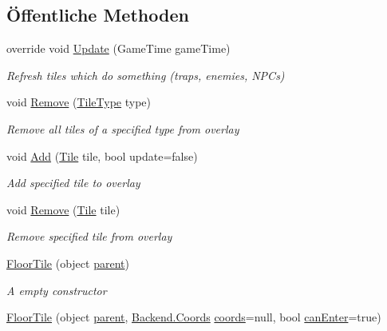 \subsection*{Öffentliche Methoden}
\begin{DoxyCompactItemize}
\item 
override void \hyperlink{class_gruppe22_1_1_backend_1_1_floor_tile_ae3d0627204d49dabc8180fd0bdd22803}{Update} (Game\-Time game\-Time)
\begin{DoxyCompactList}\small\item\em Refresh tiles which do something (traps, enemies, N\-P\-Cs) \end{DoxyCompactList}\item 
void \hyperlink{class_gruppe22_1_1_backend_1_1_floor_tile_aa181d883ef238dfca1615db12ab80606}{Remove} (\hyperlink{namespace_gruppe22_1_1_backend_a5956dac270a0deefca1d578d210550e2}{Tile\-Type} type)
\begin{DoxyCompactList}\small\item\em Remove all tiles of a specified type from overlay \end{DoxyCompactList}\item 
void \hyperlink{class_gruppe22_1_1_backend_1_1_floor_tile_a153d21fb6b8e240d822370e0c20d6ce5}{Add} (\hyperlink{class_gruppe22_1_1_backend_1_1_tile}{Tile} tile, bool update=false)
\begin{DoxyCompactList}\small\item\em Add specified tile to overlay \end{DoxyCompactList}\item 
void \hyperlink{class_gruppe22_1_1_backend_1_1_floor_tile_a6533275079b634b5fadc5cd0d1ba927f}{Remove} (\hyperlink{class_gruppe22_1_1_backend_1_1_tile}{Tile} tile)
\begin{DoxyCompactList}\small\item\em Remove specified tile from overlay \end{DoxyCompactList}\item 
\hyperlink{class_gruppe22_1_1_backend_1_1_floor_tile_a828c82cc335a8c8416861a11b0d70f65}{Floor\-Tile} (object \hyperlink{class_gruppe22_1_1_backend_1_1_tile_abc12933c70eb3a2ebbb2fde9f45c2632}{parent})
\begin{DoxyCompactList}\small\item\em A empty constructor \end{DoxyCompactList}\item 
\hyperlink{class_gruppe22_1_1_backend_1_1_floor_tile_ae90ab35dfdebf892a27d545d1fef32c0}{Floor\-Tile} (object \hyperlink{class_gruppe22_1_1_backend_1_1_tile_abc12933c70eb3a2ebbb2fde9f45c2632}{parent}, \hyperlink{class_gruppe22_1_1_backend_1_1_coords}{Backend.\-Coords} \hyperlink{class_gruppe22_1_1_backend_1_1_floor_tile_a222af0c5d8ea6b7d24d04a384f71d70b}{coords}=null, bool \hyperlink{class_gruppe22_1_1_backend_1_1_floor_tile_a07516e27f9669dd9e852cf42a1a94635}{can\-Enter}=true)

\end{DoxyCompactItemize}
